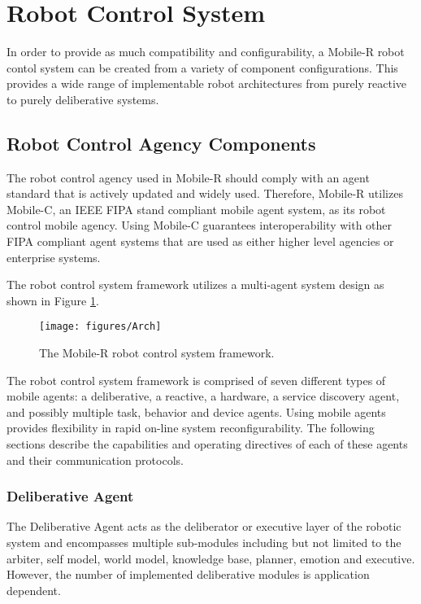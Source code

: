   \section{Robot Control System} \label{sec:rcs}
    In order to provide as much compatibility and configurability, a 
      Mobile-R robot contol system can be created from a variety of component 
      configurations.
    This provides a wide range of implementable robot architectures from 
      purely reactive to purely deliberative systems.

  \subsection{Robot Control Agency Components}
    The robot control agency used in Mobile-R should comply with 
      an agent standard that is actively updated and widely used.
    Therefore, Mobile-R utilizes Mobile-C, an IEEE FIPA stand compliant
      mobile agent system, as its robot control mobile agency.
    Using Mobile-C guarantees interoperability with other FIPA compliant agent 
      systems that are used as either higher level agencies or enterprise systems.

    The robot control system framework utilizes a multi-agent system design
      as shown in Figure \ref{fig:robo_framework}.
    \begin{figure}%
      \centerline{\texttt{[image: figures/Arch]}}
      \caption{The Mobile-R robot control system framework.}
      \label{fig:robo_framework}
    \end{figure}
    The robot control system framework is comprised of seven different types of 
      mobile agents: a deliberative, a reactive, a hardware, a service discovery
      agent, and possibly multiple task, behavior and device agents.
    Using mobile agents provides flexibility in rapid on-line system 
      reconfigurability.
    The following sections describe the capabilities and operating directives of 
      each of these agents and their communication protocols.

    \subsubsection{Deliberative Agent}
      The Deliberative Agent acts as the deliberator or executive layer of the 
        robotic system and encompasses multiple sub-modules including but not 
        limited to the arbiter, self model, world model, knowledge base, 
        planner, emotion and executive.
      However, the number of implemented deliberative modules is application 
        dependent.

